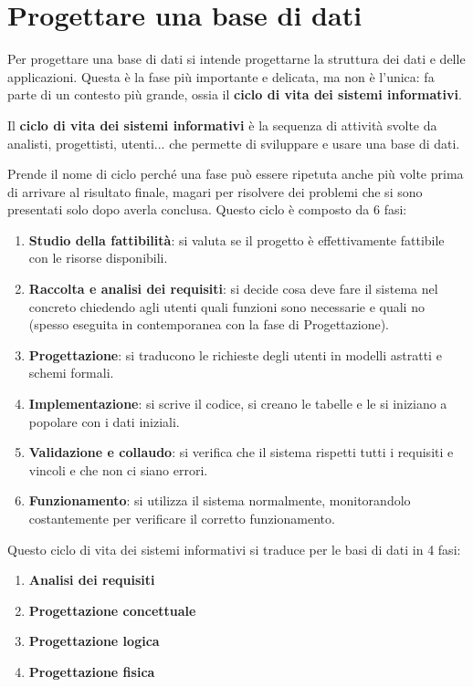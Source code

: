 \documentclass[11pt, a4paper, titlepage, oneside]{scrbook}
\begin{document}
\section{Progettare una base di dati}

Per progettare una base di dati si intende progettarne la struttura dei dati e delle applicazioni. Questa è la fase più importante e delicata, ma non è l'unica: fa parte di un contesto più grande, ossia il \textbf{ciclo di vita dei sistemi informativi}.

\begin{Definizione}
\label{def-ciclo-vita-sistemi-informativi}
Il \textbf{ciclo di vita dei sistemi informativi} è la sequenza di attività svolte da analisti, progettisti, utenti... che permette di sviluppare e usare una base di dati.
\end{Definizione}

Prende il nome di ciclo perché una fase può essere ripetuta anche più volte prima di arrivare al risultato finale, magari per risolvere dei problemi che si sono presentati solo dopo averla conclusa. Questo ciclo è composto da 6 fasi:
\begin{enumerate}[label=\arabic*°]
    \item \textbf{Studio della fattibilità}: si valuta se il progetto è effettivamente fattibile con le risorse disponibili.
    \item \textbf{Raccolta e analisi dei requisiti}: si decide cosa deve fare il sistema nel concreto chiedendo agli utenti quali funzioni sono necessarie e quali no (spesso eseguita in contemporanea con la fase di Progettazione).
    \item \textbf{Progettazione}: si traducono le richieste degli utenti in modelli astratti e schemi formali. 
    \item \textbf{Implementazione}: si scrive il codice, si creano le tabelle e le si iniziano a popolare con i dati iniziali.
    \item \textbf{Validazione e collaudo}: si verifica che il sistema rispetti tutti i requisiti e vincoli e che non ci siano errori.
    \item \textbf{Funzionamento}: si utilizza il sistema normalmente, monitorandolo costantemente per verificare il corretto funzionamento.
\end{enumerate}

Questo ciclo di vita dei sistemi informativi si traduce per le basi di dati in 4 fasi:
\begin{enumerate}[label=\arabic*°]
    \item \textbf{Analisi dei requisiti}
    \item \textbf{Progettazione concettuale}
    \item \textbf{Progettazione logica}
    \item \textbf{Progettazione fisica}
\end{enumerate}
\end{document}
